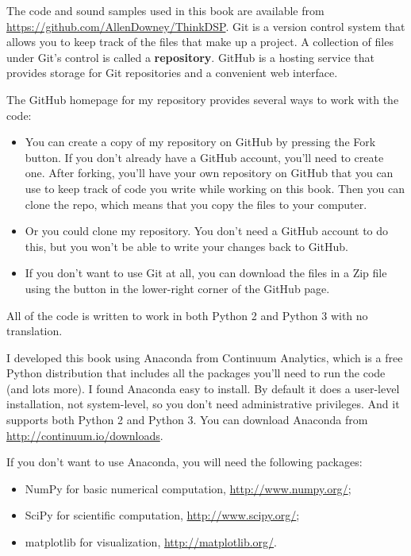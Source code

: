 \documentclass[12pt]{book}
\begin{document}
The code and sound samples used in this book are available from
\url{https://github.com/AllenDowney/ThinkDSP}.  Git is a version
control system that allows you to keep track of the files that
make up a project.  A collection of files under Git's control is
called a {\bf repository}.  GitHub is a hosting service that provides
storage for Git repositories and a convenient web interface.

The GitHub homepage for my repository provides several ways to
work with the code:

\begin{itemize}

\item You can create a copy of my repository
on GitHub by pressing the {\sf Fork} button.  If you don't already
have a GitHub account, you'll need to create one.  After forking, you'll
have your own repository on GitHub that you can use to keep track
of code you write while working on this book.  Then you can
clone the repo, which means that you copy the files
to your computer.

\item Or you could clone
my repository.  You don't need a GitHub account to do this, but you
won't be able to write your changes back to GitHub.

\item If you don't want to use Git at all, you can download the files
in a Zip file using the button in the lower-right corner of the
GitHub page.

\end{itemize}

All of the code is written to work in both Python 2 and Python 3
with no translation.

I developed this book using Anaconda from
Continuum Analytics, which is a free Python distribution that includes
all the packages you'll need to run the code (and lots more).
I found Anaconda easy to install.  By default it does a user-level
installation, not system-level, so you don't need administrative
privileges.  And it supports both Python 2 and Python 3.  You can
download Anaconda from \url{http://continuum.io/downloads}.

If you don't want to use Anaconda, you will need the following
packages:

\begin{itemize}

\item NumPy for basic numerical computation, \url{http://www.numpy.org/};

\item SciPy for scientific computation,
  \url{http://www.scipy.org/};

\item matplotlib for visualization, \url{http://matplotlib.org/}.

\end{itemize}
\end{document}
